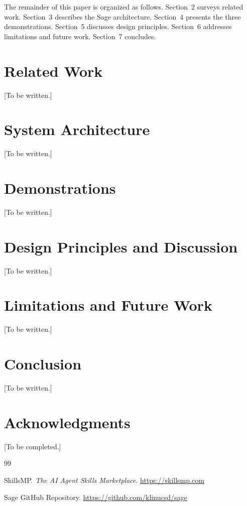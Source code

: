 \documentclass[10pt,twocolumn]{article}
\begin{document}
The remainder of this paper is organized as follows. Section~2 surveys related work.
Section~3 describes the Sage architecture. Section~4 presents the three demonstrations.
Section~5 discusses design principles. Section~6 addresses limitations and future work.
Section~7 concludes.

\section{Related Work}

[To be written.]

\section{System Architecture}

[To be written.]

\section{Demonstrations}

[To be written.]

\section{Design Principles and Discussion}

[To be written.]

\section{Limitations and Future Work}

[To be written.]

\section{Conclusion}

[To be written.]

\section*{Acknowledgments}

[To be completed.]


\begin{thebibliography}{99}

SkillsMP. \textit{The AI Agent Skills Marketplace}. \url{https://skillsmp.com}

Sage GitHub Repository. \url{https://github.com/klinucsd/sage}

\end{thebibliography}
\end{document}
